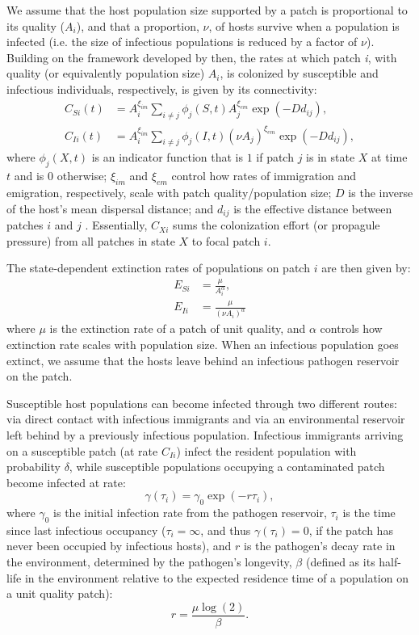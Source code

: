 \documentclass{article}
\begin{document}
We assume that the host population size supported by a patch is proportional to its quality ($A_i$), and that a proportion, $\nu$, of hosts survive when a population is infected (i.e. the size of infectious populations is reduced by a factor of $\nu$).  Building on the framework developed by \cite{Hanski2003} then, the rates at which patch \emph{i}, with quality (or equivalently population size) $A_i$, is colonized by susceptible and infectious individuals, respectively, is given by its connectivity:
\begin{align}
C_{Si}(t) &= A_i^{\xi_{im}} \sum_{i\neq j }\phi_j(S, t)A_j^{\xi_{em}}\exp(-D d_{ij}),\\
C_{Ii}(t) &= A_i^{\xi_{im}} \sum_{i\neq j }\phi_j(I, t)(\nu A_j) ^{\xi_{em}}\exp(-D d_{ij}),
\label{connectivity}
\end{align}
where $\phi_j(X, t)$ is an indicator function that is $1$ if patch $j$ is in state $X$ at time $t$ and is $0$ otherwise; $\xi_{im}$ and $\xi_{em}$ control how rates of immigration and emigration, respectively, scale with patch quality/population size; $D$ is the inverse of the host's mean dispersal distance; and $d_{ij}$ is the effective distance between patches $i$ and $j$ .  Essentially, $C_{Xi}$ sums the colonization effort (or propagule pressure) from all patches in state $X$ to focal patch $i$.  

The state-dependent extinction rates of populations on patch $i$ are then given by:
\begin{align}
E_{Si} & =\frac{\mu}{A_i^\alpha},\\
E_{Ii} & = \frac{\mu}{(\nu A_i) ^ \alpha}
\end{align}
where $\mu$ is the extinction rate of a patch of unit quality, and $\alpha$ controls how extinction rate scales with population size.  When an infectious population goes extinct, we assume that the hosts leave behind an infectious pathogen reservoir on the patch.  

Susceptible host populations can become infected through two different routes: via direct contact with infectious immigrants and via an environmental reservoir left behind by a previously infectious population.  Infectious immigrants arriving on a susceptible patch (at rate $C_{Ii}$) infect the resident population with probability $\delta$, while susceptible populations occupying a contaminated patch become infected at rate:
\begin{equation}
\gamma(\tau_i)=\gamma_0\exp \left(-r \tau_{i}\right),
\end{equation}
where $\gamma_0$ is the initial infection rate from the pathogen reservoir, $\tau_{i}$ is the time since last infectious occupancy ($\tau_{i} = \infty$, and thus $\gamma(\tau_i) = 0$, if the patch has never been occupied by infectious hosts), and $r$ is the pathogen's decay rate in the environment, determined by the pathogen's longevity, $\beta$ (defined as its half-life in the environment relative to the expected residence time of a population on a unit quality patch):
\begin{equation}
r = \frac{\mu \log(2)}{\beta}.
\end{equation}
\end{document}
